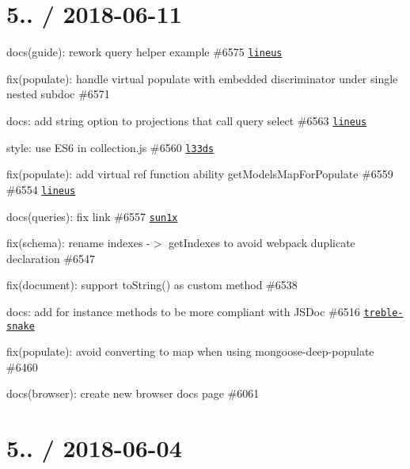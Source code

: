 \section*{5.. / 2018-\/06-\/11 }


\begin{DoxyItemize}
\item docs(guide)\+: rework query helper example \#6575 \href{https://github.com/lineus}{\tt lineus}
\item fix(populate)\+: handle virtual populate with embedded discriminator under single nested subdoc \#6571
\item docs\+: add string option to projections that call query select \#6563 \href{https://github.com/lineus}{\tt lineus}
\item style\+: use E\+S6 in collection.\+js \#6560 \href{https://github.com/l33ds}{\tt l33ds}
\item fix(populate)\+: add virtual ref function ability get\+Models\+Map\+For\+Populate \#6559 \#6554 \href{https://github.com/lineus}{\tt lineus}
\item docs(queries)\+: fix link \#6557 \href{https://github.com/sun1x}{\tt sun1x}
\item fix(schema)\+: rename indexes -\/$>$ get\+Indexes to avoid webpack duplicate declaration \#6547
\item fix(document)\+: support {\ttfamily to\+String()} as custom method \#6538
\item docs\+: add  for instance methods to be more compliant with J\+S\+Doc \#6516 \href{https://github.com/treble-snake}{\tt treble-\/snake}
\item fix(populate)\+: avoid converting to map when using mongoose-\/deep-\/populate \#6460
\item docs(browser)\+: create new browser docs page \#6061
\end{DoxyItemize}

\section*{5.. / 2018-\/06-\/04 }


